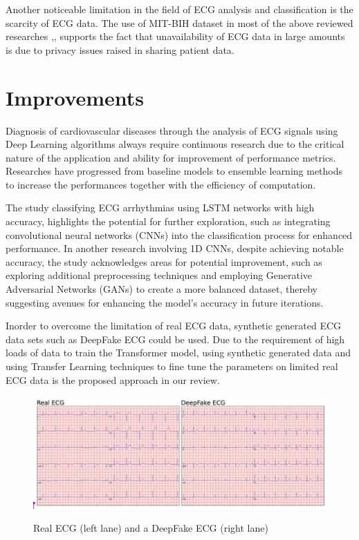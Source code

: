 \documentclass[conference]{IEEEtran}
\begin{document}
Another noticeable limitation in the field of ECG analysis and classification is the scarcity of ECG data. The use of MIT-BIH dataset in most of the above reviewed researches \cite{b6},\cite{b12},\cite{b18} supports the fact that unavailability of ECG data in large amounts is due to privacy issues raised in sharing patient data\cite{b1}.



\section{Improvements}

Diagnosis of cardiovascular diseases through the analysis of ECG signals using Deep Learning algorithms always require continuous research due to the critical nature of the application and ability for improvement of performance metrics. Researches have progressed from baseline models to ensemble learning methods to increase the performances together with the efficiency of computation.

The study classifying ECG arrhythmias using LSTM networks\cite{b8} with high accuracy, highlights the potential for further exploration, such as integrating convolutional neural networks (CNNs) into the classification process for enhanced performance. In another research\cite{b11} involving 1D CNNs, despite achieving notable accuracy, the study acknowledges areas for potential improvement, such as exploring additional preprocessing techniques and employing Generative Adversarial Networks (GANs) to create a more balanced dataset, thereby suggesting avenues for enhancing the model's accuracy in future iterations.

Inorder to overcome the limitation of real ECG data, synthetic generated ECG data sets such as DeepFake ECG\cite{b1} could be used. Due to the requirement of high loads of data to train the Transformer model, using synthetic generated data and using Transfer Learning techniques to fine tune the parameters on limited real ECG data is the proposed approach in our review.

\begin{figure}[htbp]
\centering
{\includegraphics[scale=0.2]{fig3.png}}
\caption{ Real ECG (left lane) and a DeepFake ECG (right lane) \cite{b1}}
\label{fig}
\end{figure}
\end{document}
